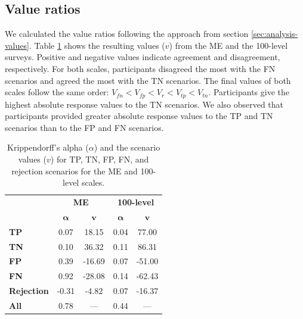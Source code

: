 \subsection{Value ratios}
\label{sec:results-value-ratios}
We calculated the value ratios following the approach from section \ref{sec:analysis-values}.
%
Table \ref{tab:values-reliability} shows the resulting values ($v$) from the ME and the 100-level surveys.
%
Positive and negative values indicate agreement and disagreement, respectively.
%
For both scales, participants disagreed the most with the FN scenarios and agreed the most with the TN scenarios.
%
The final values of both scales follow the same order: $V_{fn} < V_{fp} < V_{r} < V_{tp} < V_{tn}$.
%
Participants give the highest absolute response values to the TN scenarios.
%
We also observed that participants provided greater absolute response values to the TP and TN scenarios than to the FP and FN scenarios.
%
\begin{table}[t]
    \small
    \centering
    \begin{tabular}{lcccc}
        \toprule
                           & \multicolumn{2}{c}{\textbf{ME}} & \multicolumn{2}{c}{\textbf{100-level}}                                        \\
        \cmidrule(l){2-3} \cmidrule(l){4-5}
                           & $\boldsymbol{\alpha}$           & $\textbf{v}$                           & $\boldsymbol{\alpha}$ & $\textbf{v}$ \\
        \midrule
        \textbf{TP}        & 0.07                            & 18.15                                  & 0.04                  & 77.00        \\
        \textbf{TN}        & 0.10                            & 36.32                                  & 0.11                  & 86.31        \\
        \textbf{FP}        & 0.39                            & -16.69                                 & 0.07                  & -51.00       \\
        \textbf{FN}        & 0.92                            & -28.08                                 & 0.14                  & -62.43       \\
        \textbf{Rejection} & -0.31                           & -4.82                                  & 0.07                  & -16.37       \\
        \midrule
        \textbf{All}       & 0.78                            & ---                                    & 0.44                  & ---          \\
        \bottomrule
    \end{tabular}
    \caption{Krippendorff's alpha ($\alpha$) and the scenario values ($v$) for TP, TN, FP, FN, and rejection scenarios for the ME and 100-level scales.}
    \label{tab:values-reliability}
\end{table}

